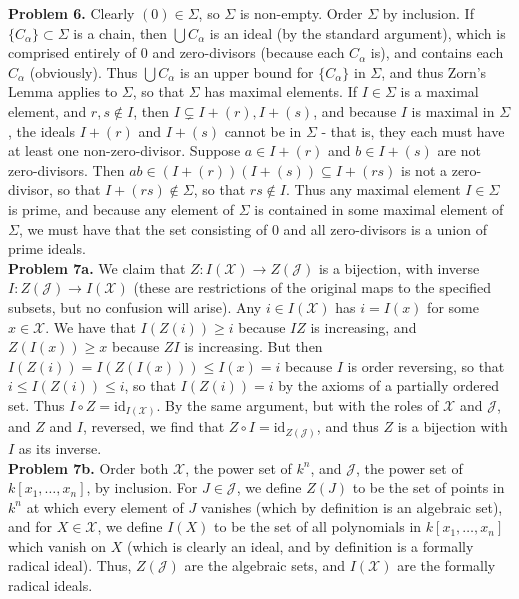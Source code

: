 \documentclass[11pt]{article}
\newcommand{\num}[1]{\noindent \textbf{#1}}
\theoremstyle{definition}
\begin{document}
\num{Problem 6.} Clearly $(0)\in\Sigma$, so $\Sigma$ is non-empty. Order $\Sigma$ by inclusion. If $\{C_\alpha\}\subset\Sigma$ is a chain, then $\bigcup C_\alpha$ is an ideal (by the standard argument), which is comprised entirely of 0 and zero-divisors (because each $C_\alpha$ is), and contains each $C_\alpha$ (obviously). Thus $\bigcup C_\alpha$ is an upper bound for $\{C_\alpha\}$ in $\Sigma$, and thus Zorn's Lemma applies to $\Sigma$, so that $\Sigma$ has maximal elements. If $I\in\Sigma$ is a maximal element, and $r,s\notin I$, then $I\subsetneq I+(r), I+(s)$, and because $I$ is maximal in $\Sigma$, the ideals $I+(r)$ and $I+(s)$ cannot be in $\Sigma$ - that is, they each must have at least one non-zero-divisor. Suppose $a\in I+(r)$ and $b\in I+(s)$ are not zero-divisors. Then $ab\in (I+(r))(I+(s))\subseteq I+(rs)$ is not a zero-divisor, so that $I+(rs)\notin\Sigma$, so that $rs\notin I$. Thus any maximal element $I\in\Sigma$ is prime, and because any element of $\Sigma$ is contained in some maximal element of $\Sigma$, we must have that the set consisting of 0 and all zero-divisors is a union of prime ideals.   \\

\num{Problem 7a.}  We claim that $Z:I(\mathcal{X})\rightarrow Z(\mathcal{J})$ is a bijection, with inverse $I:Z(\mathcal{J})\rightarrow I(\mathcal{X})$ (these are restrictions of the original maps to the specified subsets, but no confusion will arise). Any $i\in I(\mathcal{X})$ has $i=I(x)$ for some $x\in\mathcal{X}$. We have that $I(Z(i))\geq i$ because $IZ$ is increasing, and $Z(I(x))\geq x$ because $ZI$ is increasing. But then $I(Z(i))= I(Z(I(x)))\leq I(x) = i$ because $I$ is order reversing, so that $i\leq I(Z(i))\leq i$, so that $I(Z(i))=i$ by the axioms of a partially ordered set. Thus $I\circ Z = \text{id}_{I(\mathcal{X})}$. By the same argument, but with the roles of $\mathcal{X}$ and $\mathcal{J}$, and $Z$ and $I$, reversed, we find that $Z\circ I = \text{id}_{Z(\mathcal{J})}$, and thus $Z$ is a bijection with $I$ as its inverse.\\

\num{Problem 7b.} Order both $\mathcal{X}$, the power set of $k^n$, and $\mathcal{J}$, the power set of $k[x_1,\ldots,x_n]$, by inclusion. For $J\in\mathcal{J}$, we define $Z(J)$ to be the set of points in $k^n$ at which every element of $J$ vanishes (which by definition is an algebraic set), and for $X\in\mathcal{X}$, we define $I(X)$ to be the set of all polynomials in $k[x_1,\ldots,x_n]$ which vanish on $X$ (which is clearly an ideal, and by definition is a formally radical ideal). Thus, $Z(\mathcal{J})$ are the algebraic sets, and $I(\mathcal{X})$ are the formally radical ideals. \\
\end{document}
